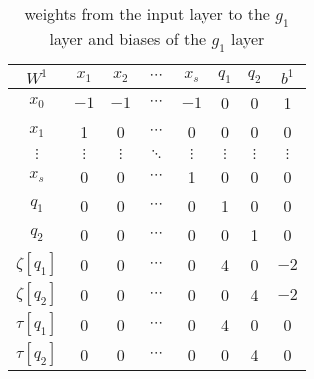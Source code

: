 \begin{table}[p]
	\centering
	\begin{tabular}{|c| c c c c c c |c|}
		\hline 
		$W^1$ & $x_1$ & $x_2$ & $\cdots$ & $x_s$ & $q_1$ & $q_2$ & $b^1$ \\
		\hline
		$x_0$ & $-1$ & $-1$ & $\cdots$ & $-1$ & 0 & 0 & 1 \\
		$x_1$ & 1 & 0 & $\cdots$ & 0 & 0 & 0 & 0 \\
		$\vdots$ & $\vdots$ & $\vdots$ & $\ddots$ & $\vdots$ & $\vdots$ & $\vdots$ & $\vdots$ \\
		$x_s$ & 0 & 0 & $\cdots$ & 1 & 0 & 0 & 0 \\
		$q_1$ & 0 & 0 & $\cdots$ & 0 & 1 & 0 & 0 \\
		$q_2$ & 0 & 0 & $\cdots$ & 0 & 0 & 1 & 0 \\
		$\zeta[q_1]$ & 0 & 0 & $\cdots$ & 0 & 4 & 0 & $-2$ \\
		$\zeta[q_2]$ & 0 & 0 & $\cdots$ & 0 & 0 & 4 & $-2$ \\
		$\tau[q_1]$ & 0 & 0 & $\cdots$ & 0 & 4 & 0 & 0 \\
		$\tau[q_2]$ & 0 & 0 & $\cdots$ & 0 & 0 & 4 & 0 \\
		\hline
	\end{tabular}
	\caption{weights from the input layer to the $g_1$ layer and biases of the $g_1$ layer}
	\label{tab:W1b1}
\end{table}